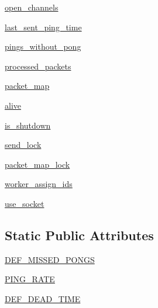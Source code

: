\begin{DoxyCompactItemize}
\item 
\hyperlink{classparlai_1_1mturk_1_1core_1_1dev_1_1socket__manager_1_1SocketManager_a2f80642e3ea590f4f9428fc2b29d6795}{open\+\_\+channels}
\item 
\hyperlink{classparlai_1_1mturk_1_1core_1_1dev_1_1socket__manager_1_1SocketManager_ac5196ddaac240e82a7b4bdba7afdf59b}{last\+\_\+sent\+\_\+ping\+\_\+time}
\item 
\hyperlink{classparlai_1_1mturk_1_1core_1_1dev_1_1socket__manager_1_1SocketManager_acc4733807d5b940c2938e5088eb452e5}{pings\+\_\+without\+\_\+pong}
\item 
\hyperlink{classparlai_1_1mturk_1_1core_1_1dev_1_1socket__manager_1_1SocketManager_a2733b963a320d8925277bd8078308d9a}{processed\+\_\+packets}
\item 
\hyperlink{classparlai_1_1mturk_1_1core_1_1dev_1_1socket__manager_1_1SocketManager_ade1c4af9d5ec8dc60997553db37b236c}{packet\+\_\+map}
\item 
\hyperlink{classparlai_1_1mturk_1_1core_1_1dev_1_1socket__manager_1_1SocketManager_a853eb0d94f86024bb140644e0a003946}{alive}
\item 
\hyperlink{classparlai_1_1mturk_1_1core_1_1dev_1_1socket__manager_1_1SocketManager_af6ccd7262adc876b6e752257a7feeb31}{is\+\_\+shutdown}
\item 
\hyperlink{classparlai_1_1mturk_1_1core_1_1dev_1_1socket__manager_1_1SocketManager_acc0a0907e66f6bf9b510b493399aaf45}{send\+\_\+lock}
\item 
\hyperlink{classparlai_1_1mturk_1_1core_1_1dev_1_1socket__manager_1_1SocketManager_a2ac5139867a0a05050ff3b388cc0e8fa}{packet\+\_\+map\+\_\+lock}
\item 
\hyperlink{classparlai_1_1mturk_1_1core_1_1dev_1_1socket__manager_1_1SocketManager_ab385890b2361f4eacf67d60584ce99fa}{worker\+\_\+assign\+\_\+ids}
\item 
\hyperlink{classparlai_1_1mturk_1_1core_1_1dev_1_1socket__manager_1_1SocketManager_a8be72239621a74314dad4e859291ae89}{use\+\_\+socket}
\end{DoxyCompactItemize}
\subsection*{Static Public Attributes}
\begin{DoxyCompactItemize}
\item 
\hyperlink{classparlai_1_1mturk_1_1core_1_1dev_1_1socket__manager_1_1SocketManager_a488eff989af00867027515cb93fe5746}{D\+E\+F\+\_\+\+M\+I\+S\+S\+E\+D\+\_\+\+P\+O\+N\+GS}
\item 
\hyperlink{classparlai_1_1mturk_1_1core_1_1dev_1_1socket__manager_1_1SocketManager_ab485b8b2a0121b59abfa4e48adb7717f}{P\+I\+N\+G\+\_\+\+R\+A\+TE}
\item 
\hyperlink{classparlai_1_1mturk_1_1core_1_1dev_1_1socket__manager_1_1SocketManager_afb8ebdeb85c8004eab205ffdade25fa1}{D\+E\+F\+\_\+\+D\+E\+A\+D\+\_\+\+T\+I\+ME}
\end{DoxyCompactItemize}


